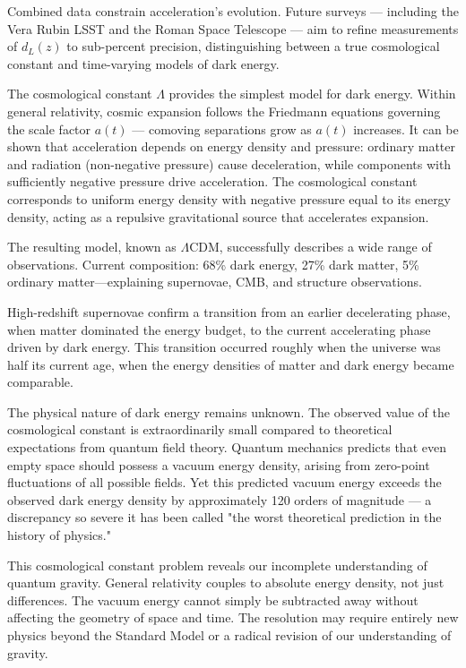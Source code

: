 Combined data constrain acceleration's evolution. Future surveys — including the Vera Rubin LSST and the Roman Space Telescope — aim to refine measurements of $d_L(z)$ to sub-percent precision, distinguishing between a true cosmological constant and time-varying models of dark energy.

The cosmological constant $\Lambda$ provides the simplest model for dark energy. Within general relativity, cosmic expansion follows the Friedmann equations governing the scale factor $a(t)$ — comoving separations grow as $a(t)$ increases. It can be shown that acceleration depends on energy density and pressure: ordinary matter and radiation (non-negative pressure) cause deceleration, while components with sufficiently negative pressure drive acceleration. The cosmological constant corresponds to uniform energy density with negative pressure equal to its energy density, acting as a repulsive gravitational source that accelerates expansion.

The resulting model, known as $\Lambda$CDM, successfully describes a wide range of observations. Current composition: 68\% dark energy, 27\% dark matter, 5\% ordinary matter—explaining supernovae, CMB, and structure observations.

High-redshift supernovae confirm a transition from an earlier decelerating phase, when matter dominated the energy budget, to the current accelerating phase driven by dark energy. This transition occurred roughly when the universe was half its current age, when the energy densities of matter and dark energy became comparable.

The physical nature of dark energy remains unknown. The observed value of the cosmological constant is extraordinarily small compared to theoretical expectations from quantum field theory. Quantum mechanics predicts that even empty space should possess a vacuum energy density, arising from zero-point fluctuations of all possible fields. Yet this predicted vacuum energy exceeds the observed dark energy density by approximately 120 orders of magnitude — a discrepancy so severe it has been called "the worst theoretical prediction in the history of physics."

This cosmological constant problem reveals our incomplete understanding of quantum gravity. General relativity couples to absolute energy density, not just differences. The vacuum energy cannot simply be subtracted away without affecting the geometry of space and time. The resolution may require entirely new physics beyond the Standard Model or a radical revision of our understanding of gravity.

